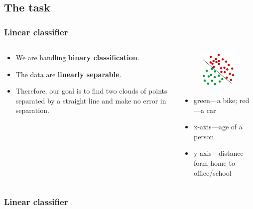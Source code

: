 \documentclass{beamer}
\begin{document}
\subsection{The task}
  \begin{frame}
    \frametitle{Linear classifier}
    \begin{columns}
      \begin{column}{5cm}
        \begin{itemize}
          \item We are handling \textbf{binary classification}.
          \item The data are \textbf{linearly separable}.
          \item Therefore, our goal is to find two clouds of points separated by a straight line and make no error in separation.
        \end{itemize}
      \end{column}
      \begin{column}{5cm}
        \begin{figure}
          \includegraphics[scale=.4]{graphics/presentation/clusters2e} 
        \end{figure}
        \begin{itemize}
          \item green---a bike; red---a car
          \item x-axis---age of a person
          \item y-axis---distance form home to office/school
        \end{itemize}
      \end{column}
    \end{columns}
  \end{frame}

  \begin{frame}
    \frametitle{Linear classifier}
  \end{frame}
\end{document}
